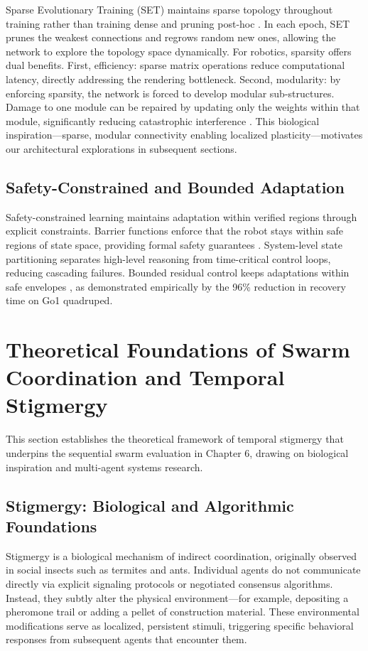 \documentclass[12pt,a4paper,oneside]{report}
\begin{document}
Sparse Evolutionary Training (SET) maintains sparse topology throughout training rather than training dense and pruning post-hoc \cite{mocanu2018scalable}. In each epoch, SET prunes the weakest connections and regrows random new ones, allowing the network to explore the topology space dynamically. For robotics, sparsity offers dual benefits. First, efficiency: sparse matrix operations reduce computational latency, directly addressing the rendering bottleneck. Second, modularity: by enforcing sparsity, the network is forced to develop modular sub-structures. Damage to one module can be repaired by updating only the weights within that module, significantly reducing catastrophic interference \cite{frankle2018lottery, mocanu2018scalable}. This biological inspiration---sparse, modular connectivity enabling localized plasticity---motivates our architectural explorations in subsequent sections.

\subsection{Safety-Constrained and Bounded Adaptation}

Safety-constrained learning maintains adaptation within verified regions through explicit constraints. Barrier functions enforce that the robot stays within safe regions of state space, providing formal safety guarantees \cite{brunke2021safe}. System-level state partitioning separates high-level reasoning from time-critical control loops, reducing cascading failures. Bounded residual control keeps adaptations within safe envelopes \cite{jayasinghe2026residual}, as demonstrated empirically by the 96\% reduction in recovery time on Go1 quadruped.

\section{Theoretical Foundations of Swarm Coordination and Temporal Stigmergy}

This section establishes the theoretical framework of temporal stigmergy that underpins the sequential swarm evaluation in Chapter 6, drawing on biological inspiration and multi-agent systems research.

\subsection{Stigmergy: Biological and Algorithmic Foundations}

Stigmergy is a biological mechanism of indirect coordination, originally observed in social insects such as termites and ants. Individual agents do not communicate directly via explicit signaling protocols or negotiated consensus algorithms. Instead, they subtly alter the physical environment---for example, depositing a pheromone trail or adding a pellet of construction material. These environmental modifications serve as localized, persistent stimuli, triggering specific behavioral responses from subsequent agents that encounter them.
\end{document}
